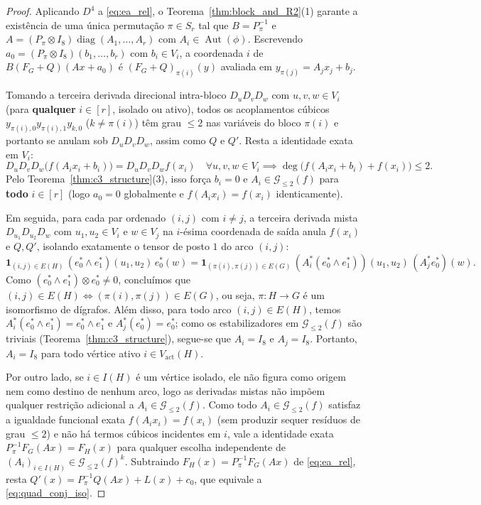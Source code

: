 \documentclass[11pt,a4paper]{article}
\theoremstyle{definition}
\theoremstyle{remark}
\newcommand{\Aut}{\operatorname{Aut}}
\begin{document}
\begin{proof}
Aplicando $D^4$ a \eqref{eq:ea_rel}, o Teorema~\ref{thm:block_and_R2}(1) garante a existência de uma única permutação $\pi \in S_r$ tal que $B = P_\pi^{-1}$ e $A = (P_\pi \otimes I_8)\operatorname{diag}(A_1,\dots,A_r)$ com $A_i \in \Aut(\phi)$. Escrevendo $a_0 = (P_\pi \otimes I_8)(b_1,\dots,b_r)$ com $b_i \in V_i$, a coordenada $i$ de $B(F_G+Q)(Ax+a_0)$ é $(F_G+Q)_{\pi(i)}(y)$ avaliada em $y_{\pi(j)} = A_j x_j + b_j$.

Tomando a terceira derivada direcional intra-bloco $D_{u}D_{v}D_{w}$ com $u,v,w \in V_i$ (para \textbf{qualquer} $i \in [r]$, isolado ou ativo), todos os acoplamentos cúbicos $y_{\pi(i),0}y_{\pi(i),1}y_{k,0}$ ($k \neq \pi(i)$) têm grau $\le 2$ nas variáveis do bloco $\pi(i)$ e portanto se anulam sob $D_u D_v D_w$, assim como $Q$ e $Q'$. Resta a identidade exata em $V_i$:
\[
  D_u D_v D_w\big(f(A_i x_i + b_i)\big) = D_u D_v D_w f(x_i) \quad \forall u,v,w \in V_i \implies \deg\big(f(A_i x_i + b_i) + f(x_i)\big) \le 2.
\]
Pelo Teorema~\ref{thm:c3_structure}(3), isso força $b_i = 0$ e $A_i \in \mathcal{G}_{\le 2}(f)$ para \textbf{todo} $i \in [r]$ (logo $a_0 = 0$ globalmente e $f(A_i x_i) = f(x_i)$ identicamente).

Em seguida, para cada par ordenado $(i,j)$ com $i \neq j$, a terceira derivada mista $D_{u_1}D_{u_2}D_w$ com $u_1,u_2 \in V_i$ e $w \in V_j$ na $i$-ésima coordenada de saída anula $f(x_i)$ e $Q, Q'$, isolando exatamente o tensor de posto $1$ do arco $(i,j)$:
\[
  \mathbf{1}_{(i,j) \in E(H)}\, (e_0^* \wedge e_1^*)(u_1, u_2)\, e_0^*(w) = \mathbf{1}_{(\pi(i),\pi(j)) \in E(G)}\, (A_i^*(e_0^* \wedge e_1^*))(u_1, u_2)\, (A_j^* e_0^*)(w).
\]
Como $(e_0^*\wedge e_1^*) \otimes e_0^* \neq 0$, concluímos que $(i,j) \in E(H) \iff (\pi(i),\pi(j)) \in E(G)$, ou seja, $\pi : H \to G$ é um isomorfismo de dígrafos. Além disso, para todo arco $(i,j) \in E(H)$, temos $A_i^*(e_0^*\wedge e_1^*) = e_0^*\wedge e_1^*$ e $A_j^*(e_0^*) = e_0^*$; como os estabilizadores em $\mathcal{G}_{\le 2}(f)$ são triviais (Teorema~\ref{thm:c3_structure}), segue-se que $A_i = I_8$ e $A_j = I_8$. Portanto, $A_i = I_8$ para todo vértice ativo $i \in V_{\mathrm{act}}(H)$.

Por outro lado, se $i \in I(H)$ é um vértice isolado, ele não figura como origem nem como destino de nenhum arco, logo as derivadas mistas não impõem qualquer restrição adicional a $A_i \in \mathcal{G}_{\le 2}(f)$. Como todo $A_i \in \mathcal{G}_{\le 2}(f)$ satisfaz a igualdade funcional exata $f(A_i x_i) = f(x_i)$ (sem produzir sequer resíduos de grau $\le 2$) e não há termos cúbicos incidentes em $i$, vale a identidade exata $P_\pi^{-1} F_G(Ax) = F_H(x)$ para qualquer escolha independente de $(A_i)_{i \in I(H)} \in \mathcal{G}_{\le 2}(f)^k$. Subtraindo $F_H(x) = P_\pi^{-1}F_G(Ax)$ de \eqref{eq:ea_rel}, resta $Q'(x) = P_\pi^{-1}Q(Ax) + L(x) + c_0$, que equivale a \eqref{eq:quad_conj_iso}.
\end{proof}
\end{document}
